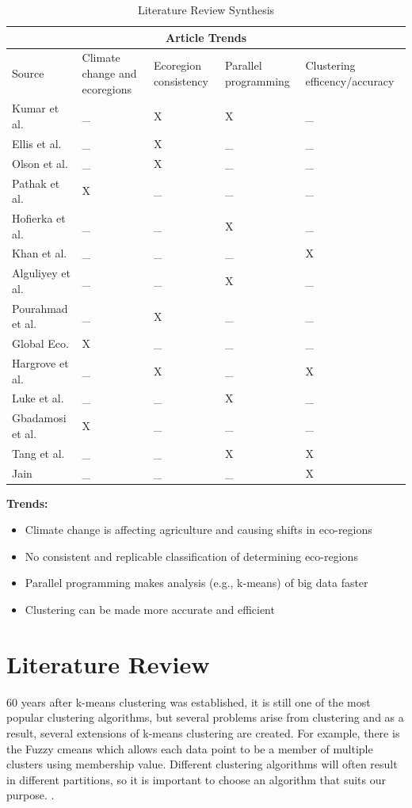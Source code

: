 \documentclass[a4paper,10pt]{article}
\begin{document}
\begin{table}[h!]
\centering
\begin{tabular}{ |p{2.7cm}| |p{2.5cm}| |p{2.5cm}| |p{2.5cm}| |p{2.5cm}| }
    \hline
    \multicolumn{5}{|c|}{Article Trends} \\
    \hline
    Source & Climate change and ecoregions & Ecoregion consistency &  Parallel programming & Clustering efficency/accuracy \\
    \hline
    Kumar et al. & \_ & X & X & \_ \\
    \hline
    Ellis et al. & \_ & X & \_ & \_ \\
    \hline
    Olson et al. & \_ & X & \_ & \_ \\
    \hline
    Pathak et al. & X & \_ & \_ & \_ \\
    \hline
    Hofierka et al. & \_ & \_ & X & \_ \\
    \hline
    Khan et al. & \_ & \_ & \_ & X \\
    \hline
    Alguliyey et al. & \_ & \_ & X & \_ \\
    \hline
    Pourahmad et al. & \_ & X & \_ & \_ \\
    \hline
    Global Eco. & X & \_ & \_ & \_ \\
    \hline
    Hargrove et al. & \_ & X & \_ & X \\
    \hline
    Luke et al. & \_ & \_ & X & \_ \\
    \hline
    Gbadamosi et al. & X & \_ & \_ & \_ \\
    \hline
    Tang et al. & \_ & \_ & X & X \\
    \hline
    Jain & \_ & \_ & \_ & X \\
    \hline
\end{tabular}
\caption{Literature Review Synthesis}
\end{table}

\textbf{Trends:}
\begin{itemize}
    \item Climate change is affecting agriculture and causing shifts in eco-regions
    \item No consistent and replicable classification of determining eco-regions
    \item Parallel programming makes analysis (e.g., k-means) of big data faster
    \item Clustering can be made more accurate and efficient
\end{itemize}

\section{Literature Review}
60 years after k-means clustering was established, it is still one of the most popular clustering algorithms, but several 
problems arise from clustering and as a result, several extensions of k-means clustering are created. For example, there is 
the Fuzzy cmeans which allows each data point to be a member of multiple clusters using membership value. Different clustering 
algorithms will often result in different partitions, so it is important to choose an algorithm that suits our purpose.
\cite{jain2010data}.  
\end{document}
